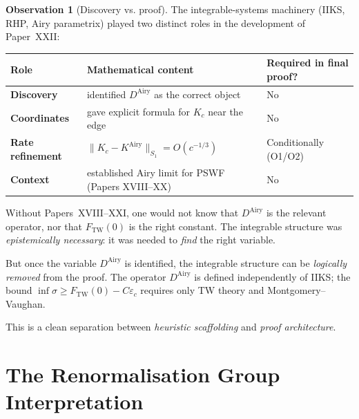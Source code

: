 \documentclass[12pt,a4paper]{amsart}
\theoremstyle{definition}
\newtheorem{observation}[theorem]{Observation}
\newcommand{\DAi}{D^{\mathrm{Airy}}}
\newcommand{\KAi}{K^{\mathrm{Airy}}}
\newcommand{\norm}[1]{\|#1\|}
\begin{document}
\begin{observation}[Discovery vs. proof]\label{obs:discovery}
The integrable-systems machinery (IIKS, RHP, Airy parametrix)
played two distinct roles in the development of Paper~XXII:
\begin{center}
\begin{tabular}{lll}
\toprule
Role & Mathematical content & Required in final proof?\\
\midrule
\textbf{Discovery} & identified $\DAi$ as the correct object & No\\
\textbf{Coordinates} & gave explicit formula for $K_c$ near the edge & No\\
\textbf{Rate refinement} & $\norm{K_c - \KAi}_{S_1} = O(c^{-1/3})$ & Conditionally (O1/O2)\\
\textbf{Context} & established Airy limit for PSWF (Papers XVIII--XX) & No\\
\bottomrule
\end{tabular}
\end{center}

\medskip
\noindent
Without Papers~XVIII--XXI, one would not know that $\DAi$ is the
relevant operator, nor that $F_{\mathrm{TW}}(0)$ is the right constant.
The integrable structure was \emph{epistemically necessary}:
it was needed to \emph{find} the right variable.

But once the variable $\DAi$ is identified, the integrable structure
can be \emph{logically removed} from the proof.
The operator $\DAi$ is defined independently of IIKS;
the bound $\inf\sigma \ge F_{\mathrm{TW}}(0) - C\varepsilon_c$ requires
only TW theory and Montgomery--Vaughan.

This is a clean separation between \emph{heuristic scaffolding}
and \emph{proof architecture}.
\end{observation}

\section{The Renormalisation Group Interpretation}
\label{sec:rg}
\end{document}
